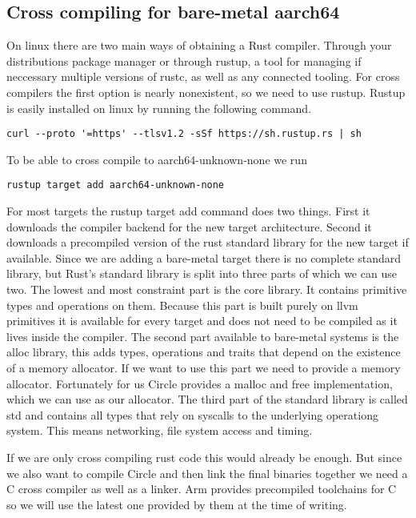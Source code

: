 \subsection{Cross compiling for bare-metal aarch64}
\label{sec:concept_and_implementation:bare-metal:cross}

On linux there are two main ways of obtaining a Rust compiler.
Through your distributions package manager or through rustup,
a tool for managing if neccessary multiple versions of rustc, as well as any connected tooling.
For cross compilers the first option is nearly nonexistent, so we need to use rustup.
Rustup is easily installed on linux by running the following command.
\begin{verbatim}
curl --proto '=https' --tlsv1.2 -sSf https://sh.rustup.rs | sh
\end{verbatim}
To be able to cross compile to aarch64-unknown-none we run
\begin{verbatim}
rustup target add aarch64-unknown-none
\end{verbatim}
For most targets the rustup target add command does two things.
First it downloads the compiler backend for the new target architecture.
Second it downloads a precompiled version of the rust standard library for the new target if available.
Since we are adding a bare-metal target there is no complete standard library, but Rust's standard library is split into three parts of which we can use two.
The lowest and most constraint part is the core library.
It contains primitive types and operations on them.
Because this part is built purely on llvm primitives it is available for every target and does not need to be compiled as it lives inside the compiler.
The second part available to bare-metal systems is the alloc library, this adds types,
operations and traits that depend on the existence of a memory allocator.
If we want to use this part we need to provide a memory allocator.
Fortunately for us Circle provides a malloc and free implementation, which we can use as our allocator.
The third part of the standard library is called std and contains all types that rely on syscalls to the underlying operationg system.
This means networking, file system access and timing.

If we are only cross compiling rust code this would already be enough.
But since we also want to compile Circle and then link the final binaries together we need a C cross compiler as well as a linker.
Arm provides precompiled toolchains for C so we will use the latest one provided by them at the time of writing.

